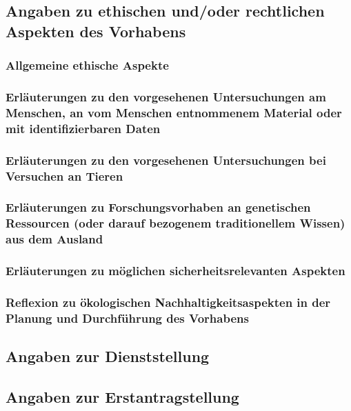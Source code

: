 \documentclass[german, 53.01]{proposal}
\begin{document}
\subsection{Angaben zu ethischen und/oder rechtlichen Aspekten des Vorhabens}

\subsubsection{Allgemeine ethische Aspekte}

\subsubsection{Erläuterungen zu den vorgesehenen Untersuchungen am Menschen, an vom Menschen entnommenem Material oder mit identifizierbaren Daten}

\subsubsection{Erläuterungen zu den vorgesehenen Untersuchungen bei Versuchen an Tieren}

\subsubsection{Erläuterungen zu Forschungsvorhaben an genetischen Ressourcen (oder darauf bezogenem traditionellem Wissen) aus dem Ausland}

\subsubsection{Erläuterungen zu möglichen sicherheitsrelevanten Aspekten}



\subsubsection{Reflexion zu ökologischen Nachhaltigkeitsaspekten in der Planung und Durchführung des Vorhabens}

\subsection{Angaben zur Dienststellung}

\subsection{Angaben zur Erstantragstellung}
\end{document}
